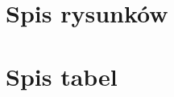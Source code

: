 \documentclass[12pt]{article}
\begin{document}
\section{Spis rysunków}


\section{Spis tabel}
\end{document}
